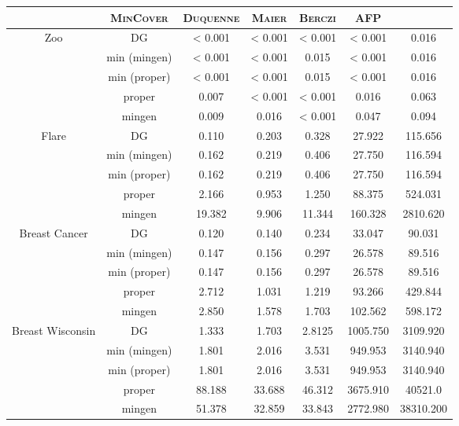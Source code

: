 \begin{table}[ht]
	\centering
\begin{tabular}{| c | c || c | c | c | c | c |}
	\hline \rowcolor{clouds}
	\multicolumn{2}{c}{$\I$} & \textsc{MinCover} & \textsc{Duquenne} & \textsc{Maier} & \textsc{Berczi} & \textsc{AFP} \\ \hline
	
	\multirow{5}{*}{Zoo} & DG & < 0.001 & < 0.001 & < 0.001 & < 0.001 & 0.016 \\
	& min (mingen) & < 0.001 & < 0.001 & 0.015 & < 0.001 & 0.016 \\
	& min (proper) & < 0.001 & < 0.001 & 0.015 & < 0.001 & 0.016 \\
	& proper & 0.007 & < 0.001 & < 0.001 & 0.016 & 0.063 \\
	& mingen & 0.009 & 0.016 & < 0.001 & 0.047 & 0.094 \\ \hline
	
	\multirow{5}{*}{Flare} & DG & 0.110 & 0.203 & 0.328 & 27.922 & 115.656 \\
	& min (mingen) & 0.162 & 0.219 & 0.406 & 27.750 & 116.594 \\
	& min (proper) & 0.162 & 0.219 & 0.406 & 27.750 & 116.594 \\
	& proper & 2.166 & 0.953 & 1.250 & 88.375 & 524.031 \\
	& mingen & 19.382 & 9.906 & 11.344 & 160.328 & 2810.620 \\ \hline
	
	\multirow{5}{*}{Breast Cancer} & DG & 0.120 & 0.140 & 0.234 & 33.047 & 90.031 \\
	& min (mingen) & 0.147 & 0.156 & 0.297 & 26.578 & 89.516 \\
	& min (proper) & 0.147 & 0.156 & 0.297 & 26.578 & 89.516 \\
	& proper & 2.712 & 1.031 & 1.219 & 93.266 & 429.844 \\
	& mingen & 2.850 & 1.578 & 1.703 & 102.562 & 598.172 \\ \hline
	
	\multirow{5}{*}{Breast Wisconsin} & DG & 1.333 & 1.703 & 2.8125 & 1005.750 & 3109.920 \\
	& min (mingen) & 1.801 & 2.016 & 3.531 & 949.953 & 3140.940 \\
	& min (proper) & 1.801 & 2.016 & 3.531 & 949.953 & 3140.940 \\
	& proper & 88.188 & 33.688 & 46.312 & 3675.910 & 40521.0 \\
	& mingen & 51.378 & 32.859 & 33.843 & 2772.980 & 38310.200 \\ \hline
	

\end{tabular}
\end{table}
